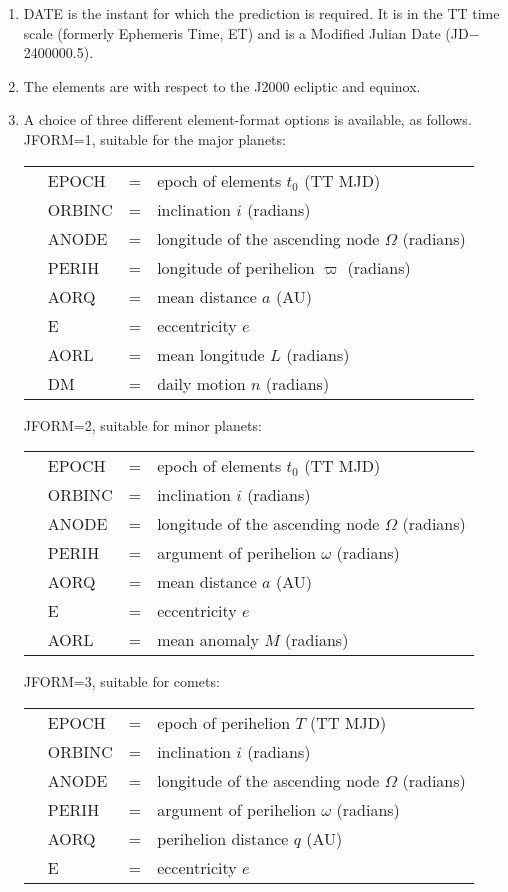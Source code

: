\documentclass[11pt,twoside,nolof]{starlink}
\begin{document}
{
 \begin{enumerate}
  \item DATE is the instant for which the prediction is required.  It is
        in the TT time scale (formerly Ephemeris Time, ET) and is a
        Modified Julian Date (JD$-$2400000.5).
  \item The elements are with respect to the J2000 ecliptic and equinox.
  \item A choice of three different element-format options is available, as
        follows. \\

        JFORM=1, suitable for the major planets:

        \begin{tabular}{llll}
        & EPOCH  & = & epoch of elements $t_0$ (TT MJD) \\
        & ORBINC & = & inclination $i$ (radians) \\
        & ANODE  & = & longitude of the ascending node $\Omega$ (radians) \\
        & PERIH  & = & longitude of perihelion $\varpi$ (radians) \\
        & AORQ   & = & mean distance $a$ (AU) \\
        & E      & = & eccentricity $e$ \\
        & AORL   & = & mean longitude $L$ (radians) \\
        & DM     & = & daily motion $n$ (radians)
        \end{tabular}

        JFORM=2, suitable for minor planets:

        \begin{tabular}{llll}
        & EPOCH  & = & epoch of elements $t_0$ (TT MJD) \\
        & ORBINC & = & inclination $i$ (radians) \\
        & ANODE  & = & longitude of the ascending node $\Omega$ (radians) \\
        & PERIH  & = & argument of perihelion $\omega$ (radians) \\
        & AORQ   & = & mean distance $a$ (AU) \\
        & E      & = & eccentricity $e$ \\
        & AORL   & = & mean anomaly $M$ (radians)
        \end{tabular}

        JFORM=3, suitable for comets:

        \begin{tabular}{llll}
        & EPOCH  & = & epoch of perihelion $T$ (TT MJD) \\
        & ORBINC & = & inclination $i$ (radians) \\
        & ANODE  & = & longitude of the ascending node $\Omega$ (radians) \\
        & PERIH  & = & argument of perihelion $\omega$ (radians) \\
        & AORQ   & = & perihelion distance $q$ (AU) \\
        & E      & = & eccentricity $e$
        \end{tabular}


\end{enumerate}}
\end{document}
